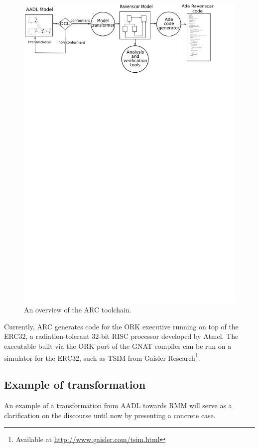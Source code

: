 \begin{figure}
\centering
\includegraphics[scale=0.6]{figs/ARC_process}
\caption{An overview of the ARC toolchain.}
\label{fig:arc_process}
\end{figure}

Currently, ARC generates code for the ORK executive running on top of
the ERC32, a radiation-tolerant 32-bit RISC processor developed by
Atmel\circledR. The executable built via the ORK port of the GNAT
compiler can be run on a simulator for the ERC32, such as TSIM from
Gaisler Research\footnote{Available at
  \url{http://www.gaisler.com/tsim.html}}.

\subsection{Example of transformation}
An example of a transformation from AADL towards RMM will serve as a
clarification on the discourse until now by presenting a concrete case.

